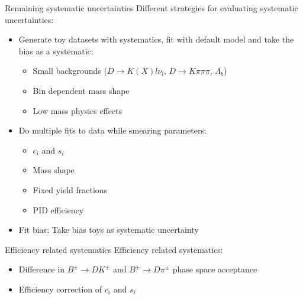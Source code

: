 \documentclass{beamer}
\begin{document}
\begin{frame}{Remaining systematic uncertainties}
  Different strategies for evaluating systematic uncertainties:
  \vspace{0.2cm}
  \begin{itemize}
    \setlength\itemsep{1em}
    \item{Generate toy datasets with systematics, fit with default model and take the bias as a systematic:}
    \begin{itemize}
      \item{Small backgrounds ($D\to K(X)l\nu_l$, $D\to K\pi\pi\pi$, $\Lambda_b$)}
      \item{Bin dependent mass shape}
      \item{Low mass physics effects}
    \end{itemize}
    \item{Do multiple fits to data while smearing parameters:}
    \begin{itemize}
      \item{$c_i$ and $s_i$}
      \item{Mass shape}
      \item{Fixed yield fractions}
      \item{PID efficiency}
    \end{itemize}
    \item{Fit bias: Take bias toys as systematic uncertainty}
  \end{itemize}
\end{frame}

\begin{frame}{Efficiency related systematics}
  Efficiency related systematics:
  \vspace{0.7cm}
  \begin{itemize}
    \setlength\itemsep{2em}
    \item{Difference in $B^\pm\to DK^\pm$ and $B^\pm\to D\pi^\pm$ phase space acceptance}
    \item{Efficiency correction of $c_i$ and $s_i$}
  \end{itemize}
\end{frame}
\end{document}
